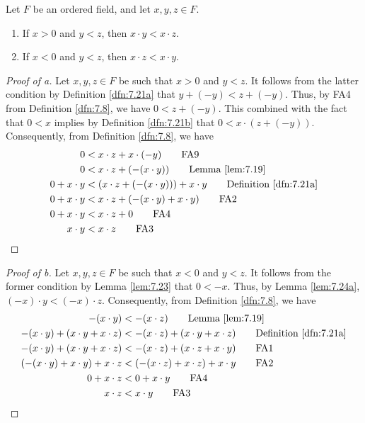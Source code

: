 \documentclass[../main.tex]{subfiles}
\begin{document}
\begin{lemma}\label{lem:7.24}
    Let $F$ be an ordered field, and let $x,y,z\in F$.
    \begin{enumerate}[label={\textup{(}\alph*\textup{)}},ref={\thelemma\alph*}]
        \item \label{lem:7.24a}If $x>0$ and $y<z$, then $x\cdot y<x\cdot z$.
        \item \label{lem:7.24b}If $x<0$ and $y<z$, then $x\cdot z<x\cdot y$.
    \end{enumerate}
    \begin{proof}[Proof of a]
        Let $x,y,z\in F$ be such that $x>0$ and $y<z$. It follows from the latter condition by Definition \ref{dfn:7.21a} that $y+(-y)<z+(-y)$. Thus, by FA4 from Definition \ref{dfn:7.8}, we have $0<z+(-y)$. This combined with the fact that $0<x$ implies by Definition \ref{dfn:7.21b} that $0<x\cdot(z+(-y))$. Consequently, from Definition \ref{dfn:7.8}, we have
        \begin{align*}
            0 &< x\cdot z+x\cdot(-y)\tag*{FA9}\\
            0 &< x\cdot z+(-(x\cdot y))\tag*{Lemma \ref{lem:7.19}}\\
            0+x\cdot y &< (x\cdot z+(-(x\cdot y)))+x\cdot y\tag*{Definition \ref{dfn:7.21a}}\\
            0+x\cdot y &< x\cdot z+(-(x\cdot y)+x\cdot y)\tag*{FA2}\\
            0+x\cdot y &< x\cdot z+0\tag*{FA4}\\
            x\cdot y &< x\cdot z\tag*{FA3}
        \end{align*}
    \end{proof}
    \begin{proof}[Proof of b]
        Let $x,y,z\in F$ be such that $x<0$ and $y<z$. It follows from the former condition by Lemma \ref{lem:7.23} that $0<-x$. Thus, by Lemma \ref{lem:7.24a}, $(-x)\cdot y<(-x)\cdot z$. Consequently, from Definition \ref{dfn:7.8}, we have
        \begin{align*}
            -(x\cdot y) &< -(x\cdot z)\tag*{Lemma \ref{lem:7.19}}\\
            -(x\cdot y)+(x\cdot y+x\cdot z) &< -(x\cdot z)+(x\cdot y+x\cdot z)\tag*{Definition \ref{dfn:7.21a}}\\
            -(x\cdot y)+(x\cdot y+x\cdot z) &< -(x\cdot z)+(x\cdot z+x\cdot y)\tag*{FA1}\\
            (-(x\cdot y)+x\cdot y)+x\cdot z &< (-(x\cdot z)+x\cdot z)+x\cdot y\tag*{FA2}\\
            0+x\cdot z &< 0+x\cdot y\tag*{FA4}\\
            x\cdot z &< x\cdot y\tag*{FA3}
        \end{align*}
    \end{proof}
\end{lemma}
\end{document}
